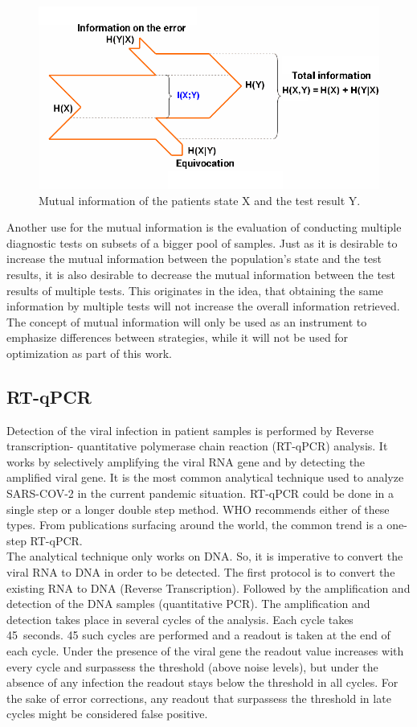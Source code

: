 \documentclass[fleqn,10pt]{wlscirep}
\begin{document}
	\begin{figure}[ht]
		\centering
		\includegraphics[width=0.7\linewidth]{pics/Entroy_XY_Eng.png}
		\caption{Mutual information \cite{Transinformation} of the patients state X and the test result Y.}
		\label{fig:mutual_information}
	\end{figure}
	
	Another use for the mutual information is the evaluation of conducting multiple diagnostic tests on subsets of a bigger pool of samples. Just as it is desirable to increase the mutual information between the population's state and the test results, it is also desirable to decrease the mutual information between the test results of multiple tests. This originates in the idea, that obtaining the same information by multiple tests will not increase the overall information retrieved. The concept of mutual information will only be used as an instrument to emphasize differences between strategies, while it will not be used for optimization as part of this work.
	
	
	\subsection{RT-qPCR}
	Detection of the viral infection in patient samples is performed by Reverse transcription- quantitative polymerase chain reaction (RT-qPCR) analysis. It works by selectively amplifying the viral RNA gene and by detecting the amplified viral gene. It is the most common analytical technique used to analyze SARS-COV-2 in the current pandemic situation. RT-qPCR could be done in a single step or a longer double step method. WHO recommends either of these types. From publications surfacing around the world, the common trend is a one-step RT-qPCR.\\
	
	The analytical technique only works on DNA. So, it is imperative to convert the viral RNA to DNA in order to be detected. The first protocol is to convert the existing RNA to DNA (Reverse Transcription). Followed by the amplification and detection of the DNA samples (quantitative PCR). The amplification and detection takes place in several cycles of the analysis. Each cycle takes \SI{45}{seconds}. 45 such cycles are performed and a readout is taken at the end of each cycle. Under the presence of the viral gene the readout value increases with every cycle and surpassess the threshold (above noise levels), but under the absence of any infection the readout stays below the threshold in all cycles. For the sake of error corrections, any readout that surpassess the threshold in late cycles might be considered false positive.\\
	
\end{document}

